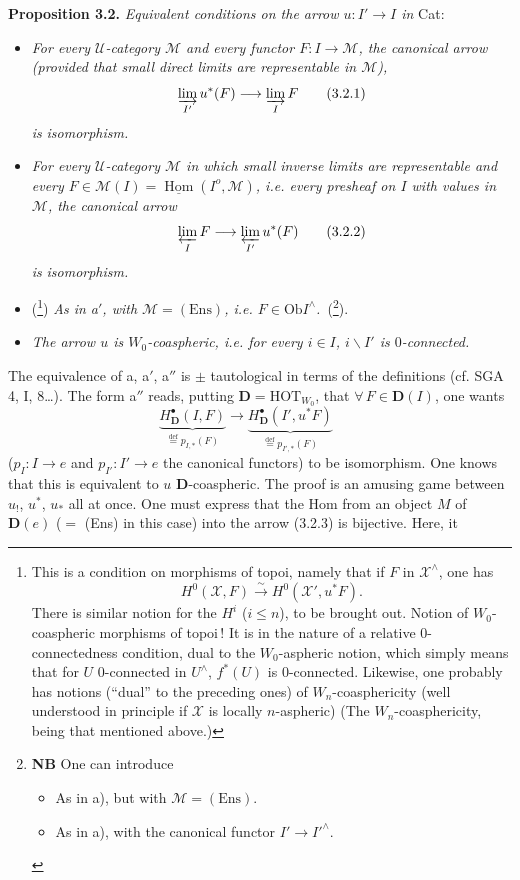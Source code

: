 \documentclass[11pt]{article}
\newcommand{\msp}[1]{\marginpar{\footnotesize [#1]}}
\newcommand{\HOT}{\mathrm{HOT}}
\newcommand{\Ob}{\mathrm{Ob}}
\newcommand{\Ens}{\mathrm{Ens}}
\newcommand{\defeq}{\overset{\text{def}}{=}}
\newcommand{\uHom}{\underline{\operatorname{Hom}}}
\begin{document}
\noindent\textbf{Proposition 3.2.} \textit{Equivalent conditions on the arrow $u : I' \longrightarrow I$ in} Cat:
\begin{itemize}
\item[a)] \textit{For every $\mathcal{U}$-category $\mathcal{M}$ and every functor $F : I \longrightarrow \mathcal{M}$, the canonical arrow (provided that small direct limits are representable in $\mathcal{M}$),}
\[
\varinjlim_{I'} u^*(F) \longrightarrow \varinjlim_{I} F \tag*{(3.2.1)}
\]
\msp{page 44}
\textit{is} \textit{isomorphism.}
\item[a$'$)] \textit{For every $\mathcal{U}$-category $\mathcal{M}$ in which small inverse limits are representable and every $F \in \mathcal{M}(I) = \uHom(I^o,\mathcal{M})$, i.e. every presheaf on $I$ with values in $\mathcal{M}$, the canonical arrow}
\[
\varprojlim_{I} F \longrightarrow \varprojlim_{I'} u^*(F) \tag*{(3.2.2)}
\]
\textit{is} \textit{isomorphism.}
\item[a$''$)] (\footnote[53]{This is a condition on morphisms of topoi, namely that if $F$ in $\mathcal{X}^{\wedge}$, one has
\[
H^0(\mathcal{X},F) \xrightarrow{\;\sim\;} H^0(\mathcal{X}',u^*F).
\]
There is similar notion for the $H^i$ ($i \leq n$), to be brought out. Notion of $W_0$-coaspheric morphisms of topoi\,! It is in the nature of a relative 0-connectedness condition, dual to the $W_0$-aspheric notion, which simply means that for $U$ 0-connected in $U^{\wedge}$, $f^*(U)$ is 0-connected. Likewise, one probably has notions (``dual'' to the preceding ones) of $W_n$-coasphericity (well understood in principle if $\mathcal{X}$ is locally $n$-aspheric) (The $W_n$-coasphericity, being that mentioned above.)}) \textit{As in a$'$, with $\mathcal{M} = (\Ens)$, i.e. $F \in \Ob I^{\wedge}$.}~(\footnote[54]{\textbf{NB} One can introduce
\begin{itemize}
\item[a$'''$)] As in a), but with $\mathcal{M} = (\Ens)$.
\item[a$^{IV}$)] As in a), with the canonical functor $I' \longrightarrow I'^{\wedge}$.
\end{itemize}}).
\item[b)] \textit{The arrow $u$ is $W_0$-coaspheric, i.e. for every $i \in I$, $i\backslash I'$ is $0$-connected.}
\end{itemize}
The equivalence of a, a$'$, a$''$ is $\pm$ tautological in terms of the definitions (cf. SGA 4, I, 8\dots). The form a$''$ reads, putting $\mathbf{D} = \HOT_{W_0}$, that $\forall\, F \in \mathbf{D}(I)$, one wants
\[
\underbrace{H^{\bullet}_{\mathbf{D}}(I,F)}_{\defeq p_{I,*}(F)} \longrightarrow \underbrace{H^{\bullet}_{\mathbf{D}}(I',u^*F)}_{\defeq p_{I',*}(F)} \qquad \tag*{(3.2.3)}
\]
($p_I : I \longrightarrow e$ and $p_{I'} : I' \longrightarrow e$ the canonical functors) to be isomorphism. One knows that this is equivalent to $u$ $\mathbf{D}$-coaspheric. The proof is an amusing game between $u_!$, $u^*$, $u_*$ all at once. One must express that the Hom from an object $M$ of $\mathbf{D}(e)$ ($=$ (Ens) in this case) into the arrow (3.2.3) is bijective. Here, it %
\end{document}
